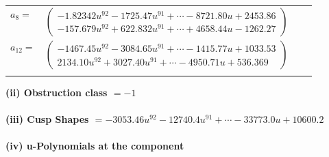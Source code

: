 \documentclass[1p]{elsarticle_modified}
\theoremstyle{definition}
\begin{document}
\begin{tabular}{m{7pt} m{180pt} m{7pt} m{180pt} }
\flushright $a_{8}=$&$\begin{pmatrix}-1.82342 u^{92}-1725.47 u^{91}+\cdots-8721.80 u+2453.86\\-157.679 u^{92}+622.832 u^{91}+\cdots+4658.44 u-1262.27\end{pmatrix}$ \\
\flushright $a_{12}=$&$\begin{pmatrix}-1467.45 u^{92}-3084.65 u^{91}+\cdots-1415.77 u+1033.53\\2134.10 u^{92}+3027.40 u^{91}+\cdots-4950.71 u+536.369\end{pmatrix}$\\&\end{tabular}
\flushleft \textbf{(ii) Obstruction class $= -1$}\\~\\
\flushleft \textbf{(iii) Cusp Shapes $= -3053.46 u^{92}-12740.4 u^{91}+\cdots-33773.0 u+10600.2$}\\~\\
\newpage\renewcommand{\arraystretch}{1}
\flushleft \textbf{(iv) u-Polynomials at the component}\newline \\
\end{document}
